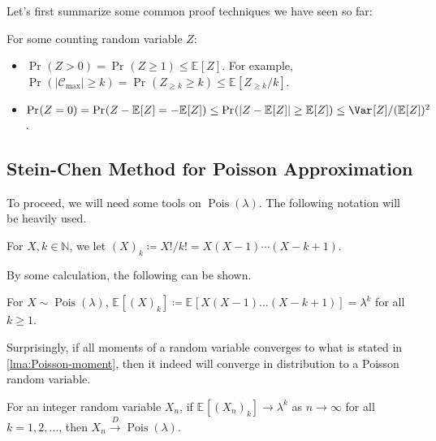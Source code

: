 Let's first summarize some common proof techniques we have seen so far:

\begin{prev}
	For some counting random variable \(Z\):
	\begin{itemize}
		\item \(\Pr_{}(Z > 0) = \Pr_{}(Z \geq 1) \leq \mathbb{E}_{}[Z] \). For example, \(\Pr_{}(\lvert \mathcal{C} _{\max } \rvert \geq k) = \Pr_{}(Z_{\geq k} \geq k) \leq \mathbb{E}_{}[Z_{\geq k} / k] \).
		\item \(\Pr_{}(Z = 0) = \Pr_{}(Z - \mathbb{E}_{}[Z] = - \mathbb{E}_{}[Z] ) \leq \Pr_{}(\lvert Z - \mathbb{E}_{}[Z] \rvert \geq \mathbb{E}_{}[Z] ) \leq \Var_{}[Z] / (\mathbb{E}_{}[Z] )^2\).
	\end{itemize}
\end{prev}

\subsection{Stein-Chen Method for Poisson Approximation}
To proceed, we will need some tools on \(\operatorname{Pois}(\lambda ) \). The following notation will be heavily used.

\begin{notation}
	For \(X, k \in \mathbb{N} \), we let \((X)_k \coloneqq X! / k! = X (X-1) \cdots (X-k+1)\).
\end{notation}

By some calculation, the following can be shown.

\begin{lemma}\label{lma:Poisson-moment}
	For \(X \sim \operatorname{Pois}(\lambda ) \), \(\mathbb{E}_{}[(X)_k] \coloneqq \mathbb{E}_{}[X (X - 1) \dots (X-k+1)] = \lambda ^k\) for all \(k \geq 1\).
\end{lemma}

Surprisingly, if all moments of a random variable converges to what is stated in \autoref{lma:Poisson-moment}, then it indeed will converge in distribution to a Poisson random variable.

\begin{lemma}\label{lma:Poisson-moment-convergence}
	For an integer random variable \(X_n\), if \(\mathbb{E}_{}[(X_n)_k] \to \lambda ^k\) as \(n \to \infty \) for all \(k = 1, 2, \dots \), then \(X_n \overset{D}{\to} \operatorname{Pois}(\lambda ) \).
\end{lemma}

